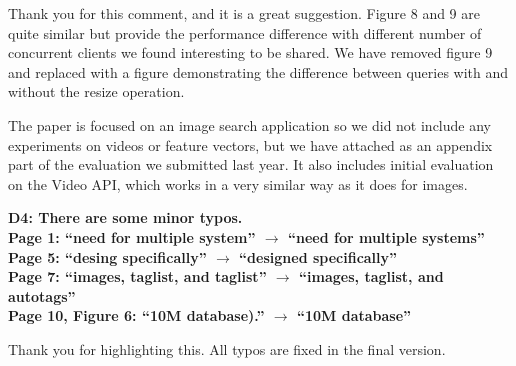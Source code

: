 \documentclass[11pt]{proposalnsf}
\begin{document}
Thank you for this comment, and it is a great suggestion.
Figure 8 and 9 are quite similar but provide the performance difference with different
number of concurrent clients we found interesting to be shared.
We have removed figure 9 and replaced with a figure
demonstrating the difference between queries with and without the resize operation.

The paper is focused on an image search application so we did not include any
experiments on videos or feature vectors, but we have attached as an appendix
part of the evaluation we submitted last year.
It also includes initial evaluation on the Video API, which works in a very
similar way as it does for images.

\bigskip
\noindent %
\textbf{
D4: There are some minor typos.\\
Page 1: “need for multiple system” $\rightarrow$  “need for multiple systems”\\
Page 5: “desing specifically” $\rightarrow$ “designed specifically”\\
Page 7: “images, taglist, and taglist” $\rightarrow$ “images, taglist, and autotags”\\
Page 10, Figure 6: “10M database).” $\rightarrow$ “10M database”
}\bigskip

Thank you for highlighting this. All typos are fixed in the final version.

\end{document}
